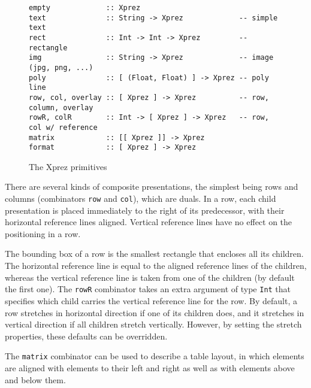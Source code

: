 \begin{figure}
\begin{small}
\begin{center}
\begin{small}
\begin{verbatim}
empty             :: Xprez
text              :: String -> Xprez             -- simple text
rect              :: Int -> Int -> Xprez         -- rectangle
img               :: String -> Xprez             -- image (jpg, png, ...)
poly              :: [ (Float, Float) ] -> Xprez -- poly line
row, col, overlay :: [ Xprez ] -> Xprez          -- row, column, overlay
rowR, colR        :: Int -> [ Xprez ] -> Xprez   -- row, col w/ reference
matrix            :: [[ Xprez ]] -> Xprez
format            :: [ Xprez ] -> Xprez
\end{verbatim}
\end{small}
\caption{The {\sc Xprez} primitives}\label{xprezprim} 
\end{center}
\end{small}
\end{figure}

There are several kinds of composite presentations, the simplest being rows and columns (combinators \texttt{row} and \texttt{col}), which are duals. In a row, each child presentation is placed immediately to the right of its predecessor, with their horizontal reference lines aligned. Vertical reference lines have no effect on the positioning in a row.

\begin{center}
\end{center}

\noindent The bounding box of a row is the smallest rectangle that encloses all its children. The horizontal reference line is equal to the aligned reference lines of the children, whereas the vertical reference line is taken from one of the children (by default the first one). The \texttt{rowR} combinator takes an extra argument of type \texttt{Int} that specifies which child carries the vertical reference line for the row. \texttt{}By default, a row stretches in horizontal direction if one of its children does, and it stretches in vertical direction if all children stretch vertically. However, by setting the stretch properties, these defaults can be overridden. 

The \texttt{matrix} combinator can be used to describe a table layout, in which elements are aligned with elements to their left and right as well as with elements above and below them. 


